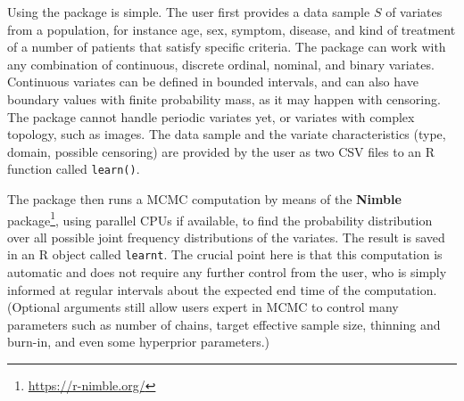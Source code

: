 Using the package is simple. The user first provides a data sample $S$ of variates from a population, for instance age, sex, symptom, disease, and kind of treatment of a number of patients that satisfy specific criteria. The package can work with any combination of continuous, discrete ordinal, nominal, and binary variates. Continuous variates can be defined in bounded intervals, and can also have boundary values with finite probability mass, as it may happen with censoring. The package cannot handle periodic variates yet, or variates with complex topology, such as images. The data sample and the variate characteristics (type, domain, possible censoring) are provided by the user as two CSV files to an R function called \texttt{learn()}.

The package then runs a MCMC computation by means of the \textbf{Nimble} package\footnote{\url{https://r-nimble.org/}}, using parallel CPUs if available, to find the probability distribution over all possible joint frequency distributions of the variates. The result is saved in an R object called \texttt{learnt}. The crucial point here is that this computation is automatic and does not require any further control from the user, who is simply informed at regular intervals about the expected end time of the computation. (Optional arguments still allow users expert in MCMC to control many parameters such as number of chains, target effective sample size, thinning and burn-in, and even some hyperprior parameters.)

